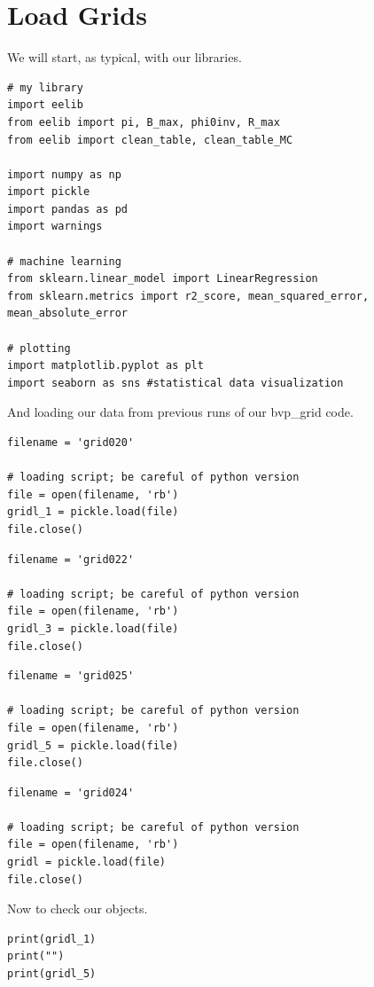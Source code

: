 \documentclass{article}
\begin{document}
\section{Load Grids}

We will start, as typical, with our libraries.

\begin{lstlisting}
# my library
import eelib
from eelib import pi, B_max, phi0inv, R_max
from eelib import clean_table, clean_table_MC

import numpy as np
import pickle
import pandas as pd
import warnings

# machine learning
from sklearn.linear_model import LinearRegression
from sklearn.metrics import r2_score, mean_squared_error, mean_absolute_error

# plotting
import matplotlib.pyplot as plt
import seaborn as sns #statistical data visualization
\end{lstlisting}

And loading our data from previous runs of our bvp\_grid code.

\begin{lstlisting}
filename = 'grid020'

# loading script; be careful of python version
file = open(filename, 'rb')    
gridl_1 = pickle.load(file)
file.close()\end{lstlisting}

\begin{lstlisting}
filename = 'grid022'

# loading script; be careful of python version
file = open(filename, 'rb')    
gridl_3 = pickle.load(file)
file.close()\end{lstlisting}

\begin{lstlisting}
filename = 'grid025'

# loading script; be careful of python version
file = open(filename, 'rb')    
gridl_5 = pickle.load(file)
file.close()\end{lstlisting}

\begin{lstlisting}
filename = 'grid024'

# loading script; be careful of python version
file = open(filename, 'rb')    
gridl = pickle.load(file)
file.close()\end{lstlisting}

Now to check our objects.

\begin{lstlisting}
print(gridl_1)
print("")
print(gridl_5)
\end{lstlisting}
\end{document}
